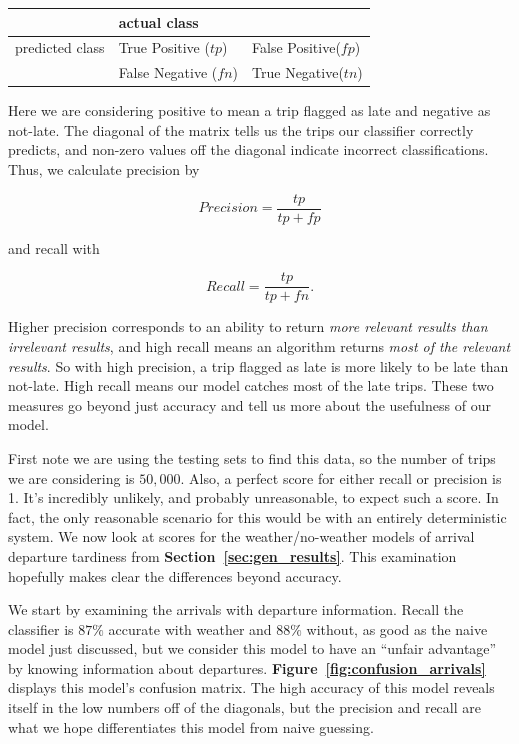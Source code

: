 \documentclass[11pt]{article} %
\begin{document}
\begin{center}
\begin{tabular}[h]{l|ll}
                     & actual class &  \\
     \hline
     predicted class & True Positive ($tp$)& False Positive($fp$)\\
                     & False Negative ($fn$)& True Negative($tn$)\\
\end{tabular}
\end{center}

Here we are considering positive to mean a trip flagged as 
late and negative as not-late. The diagonal of the matrix tells us the trips our
classifier correctly predicts, and non-zero values off the diagonal indicate 
incorrect classifications. Thus, we calculate precision by

\[Precision=\frac{tp}{tp+fp}\]

and recall with

\[Recall=\frac{tp}{tp+fn}.\]

Higher precision corresponds to an ability to return \textit{more relevant results 
than irrelevant results}, and high recall means an algorithm returns \textit{most of
the relevant results}.  So with high precision, a trip flagged as late is more 
likely to be late than not-late. High recall means our model catches most of
the late trips. These two measures go beyond just accuracy and tell us more about
the usefulness of our model.

First note we are using the testing sets to find this data, so the number of 
trips we are considering is $50,000$. Also, a perfect score for either recall or
precision is 1. It's incredibly unlikely, and probably unreasonable, to expect 
such a score. In fact, the only reasonable scenario for this would be with an
entirely deterministic system.  We now look at scores for the weather/no-weather 
models of arrival
departure tardiness from \textbf{Section~\ref{sec:gen_results}}. This examination
hopefully makes clear the differences beyond accuracy.

We start by examining the arrivals with departure information. Recall the 
classifier is $87\%$ accurate with weather and $88\%$ without, as good as the
naive model just discussed, but we consider this model to have an 
``unfair advantage'' by knowing information about departures. 
\textbf{Figure~\ref{fig:confusion_arrivals}} displays this model's confusion
matrix.
The high accuracy of this model reveals itself in the low numbers off of the 
diagonals, but the precision and recall are what we hope differentiates
this model from naive guessing. 
\end{document}
